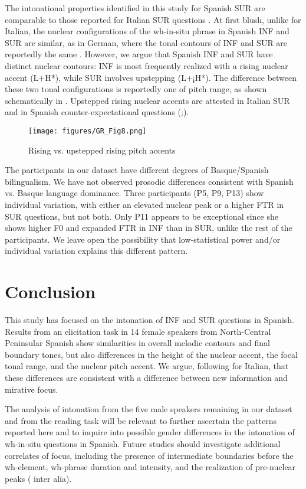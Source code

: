 \documentclass[output=paper,colorlinks,citecolor=brown,draftmode]{langscibook}
\begin{document}
The intonational properties identified in this study for Spanish SUR are comparable to those reported for Italian SUR questions \citep{BadanCrocco2019}. At first blush, unlike for Italian, the nuclear configurations of the wh-in-situ phrase in Spanish INF and SUR are similar, as in German, where the tonal contours of INF and SUR are reportedly the same \citep{ReppRosin2015}. However, we argue that Spanish INF and SUR have distinct nuclear contours: INF is most frequently realized with a rising nuclear accent (L+H*), while SUR involves upstepping (L+¡H*). The difference between these two tonal configurations is reportedly one of pitch range, as shown schematically in . Upstepped rising nuclear accents are attested in Italian SUR \citep{BadanCrocco2019} and in Spanish counter-expectational questions (\citealp{AguilarPrieto2009,Estebas-VilaplanaPrieto};\citealp[][374]{hualde2015}).

\begin{figure}
    \texttt{[image: figures/GR\_Fig8.png]}
    \caption{Rising vs. upstepped rising pitch accents  \citep{AguilarPrieto2009}}
    \label{13:Fig8}
\end{figure}

The participants in our dataset have different degrees of Basque/Spanish bilingualism. We have not observed prosodic differences consistent with Spanish vs. Basque language dominance. Three participants (P5, P9, P13) show individual variation, with either an elevated nuclear peak or a higher FTR in SUR questions, but not both. Only P11 appears to be exceptional since she shows higher F0 and expanded FTR in INF than in SUR, unlike the rest of the participants. We leave open the possibility that low-statistical power and/or individual variation explains this different pattern.
\section{Conclusion}\label{sec:13:6}
This study has focused on the intonation of INF and SUR questions in Spanish. Results from an elicitation task in 14 female speakers from North-Central Peninsular Spanish show similarities in overall melodic contours and final boundary tones, but also differences in the height of the nuclear accent, the focal tonal range, and the nuclear pitch accent. We argue, following \citet{BadanCrocco2019} for Italian, that these differences are consistent with a difference between new information and mirative focus.

\hspace*{-.2pt}The analysis of intonation from the five male speakers remaining in our dataset and from the reading task will be relevant to further ascertain the patterns reported here and to inquire into possible gender differences in the intonation of wh-in-situ questions in Spanish. Future studies should investigate additional correlates of focus, including the presence of intermediate boundaries before the wh-element, wh-phrase duration and intensity, and the realization of pre-nuclear peaks (\citealp{Chung2012,Face2001,Face2002b, gryllia2016} inter alia).
\end{document}
